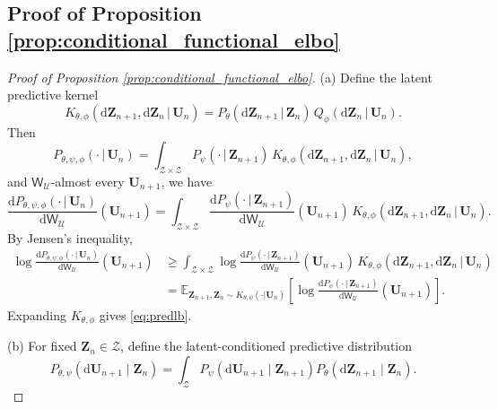 \documentclass[11pt]{article}
\newcommand{\bbE}{\mathbb{E}}
\renewcommand{\d}{\mathrm{d}}
\begin{document}
\subsection{Proof of Proposition \ref{prop:conditional_functional_elbo}}
\begin{proof}[Proof of Proposition \ref{prop:conditional_functional_elbo}]
(a) Define the latent predictive kernel
\begin{equation*}
    K_{\theta,\phi}(\d\mathbf{Z}_{n+1},\d\mathbf{Z}_n\,|\,\mathbf{U}_n)=P_\theta(\d\mathbf{Z}_{n+1}\,|\,\mathbf{Z}_n)\,Q_\phi(\d\mathbf{Z}_n\,|\,\mathbf{U}_n).
\end{equation*}
Then
\begin{equation*}
    P_{\theta,\psi,\phi}(\cdot\,|\,\mathbf{U}_n)=\int_{\mathcal{Z}\times\mathcal{Z}} P_\psi(\cdot\,|\,\mathbf{Z}_{n+1})\,K_{\theta,\phi}(\d\mathbf{Z}_{n+1},\d\mathbf{Z}_n\,|\,\mathbf{U}_n),
\end{equation*}
and $\mathsf{W}_\mathcal{U}$-almost every $\mathbf{U}_{n+1}$, we have
\begin{equation*}
    \frac{\d P_{\theta,\psi,\phi}(\cdot\,|\,\mathbf{U}_n)}{\d\mathsf{W}_\mathcal{U}}(\mathbf{U}_{n+1})=\int_{\mathcal{Z}\times\mathcal{Z}} \frac{\d P_\psi(\cdot\,|\,\mathbf{Z}_{n+1})}{\d\mathsf{W}_\mathcal{U}}(\mathbf{U}_{n+1})\,K_{\theta,\phi}(\d\mathbf{Z}_{n+1},\d\mathbf{Z}_n\,|\,\mathbf{U}_n).
\end{equation*}
By Jensen's inequality,
\begin{align*}
    \log \frac{\d P_{\theta,\psi,\phi}(\cdot\,|\,\mathbf{U}_n)}{\d\mathsf{W}_\mathcal{U}}(\mathbf{U}_{n+1})&\geq\int_{\mathcal{Z}\times\mathcal{Z}} \log \frac{\d P_\psi(\cdot\,|\,\mathbf{Z}_{n+1})}{\d\mathsf{W}_\mathcal{U}}(\mathbf{U}_{n+1})\,K_{\theta,\phi}(\d\mathbf{Z}_{n+1},\d\mathbf{Z}_n\,|\,\mathbf{U}_n)\\
    &=\bbE_{\mathbf{Z}_{n+1},\mathbf{Z}_n\sim K_{\theta,\phi}(\cdot|\mathbf{U}_n)}\left[\log \frac{\d P_\psi(\cdot\,|\,\mathbf{Z}_{n+1})}{\d\mathsf{W}_\mathcal{U}}(\mathbf{U}_{n+1})\right].
\end{align*}
Expanding $K_{\theta,\phi}$ gives \eqref{eq:predlb}.
\item (b) For fixed $\mathbf Z_n\in\mathcal{Z}$, define the latent-conditioned predictive distribution
\begin{equation*}
    P_{\theta,\psi}(\d\mathbf U_{n+1}\mid \mathbf Z_n)
    =
    \int_{\mathcal Z}
    P_\psi(\d\mathbf U_{n+1}\mid \mathbf Z_{n+1})
    P_\theta(\d\mathbf Z_{n+1}\mid \mathbf Z_n).
\end{equation*}

\end{proof}
\end{document}
